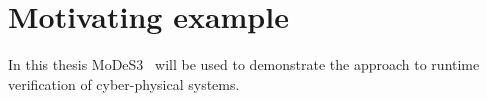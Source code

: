 \chapter{Motivating example}

In this thesis MoDeS3~\cite{} will be used to demonstrate the approach to runtime verification of cyber-physical systems.








